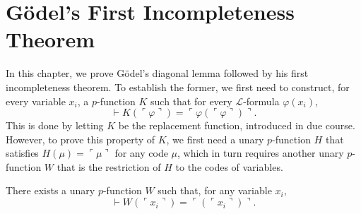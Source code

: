 \chapter{Gödel’s First Incompleteness Theorem}

In this chapter, we prove Gödel’s diagonal lemma followed by his first incompleteness theorem.
To establish the former, we first need to construct, for every variable $x_i$, 
a $p$-function $K$ such that for every $\mathcal{L}$-formula $\varphi(x_i)$,
$$
\vdash K (\ulcorner{\varphi}\urcorner) = \ulcorner{\varphi(\ulcorner {\varphi} \urcorner)}\urcorner.
$$
This is done by letting $K$ be the replacement function, introduced in due course.
However, to prove this property of $K$, we first need a unary $p$-function $H$
that satisfies $H(\mu) = \ulcorner {\mu} \urcorner$ for any code $\mu$, which in turn requires
another unary $p$-function $W$ that is the restriction of $H$ to the codes of variables.

\begin{lemma}
    \label{lem:Code.exists_pFunc_forall_var_eq_code}
    There exists a unary $p$-function $W$ such that, for any variable $x_i$,
    $$
    \vdash W(\ulcorner{x_i}\urcorner) = \ulcorner{(\ulcorner{x_i}\urcorner)}\urcorner.
    $$
\end{lemma}

